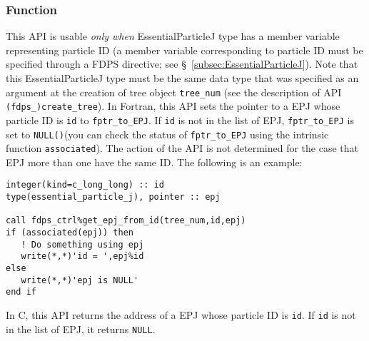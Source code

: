 \subsubsection*{Function}
This API is usable \textit{only when} EssentialParticleJ type has a member variable representing particle ID (a member variable corresponding to particle ID must be specified through a FDPS directive; see \S~\ref{subsec:EssentialParticleJ}). Note that this EssentialParticleJ type must be the same data type that was specified as an argument at the creation of tree object \texttt{tree\_num} (see the description of API \texttt{(fdps\_)create\_tree}). In Fortran, this API sets the pointer to a EPJ whose particle ID is \texttt{id} to \texttt{fptr\_to\_EPJ}. If \texttt{id} is not in the list of EPJ, \texttt{fptr\_to\_EPJ} is set to \texttt{NULL()}(you can check the status of \texttt{fptr\_to\_EPJ} using the intrinsic function \texttt{associated}). The action of the API is not determined for the case that EPJ more than one have the same ID. The following is an example:
\begin{lstlisting}[caption=Example]
integer(kind=c_long_long) :: id
type(essential_particle_j), pointer :: epj

call fdps_ctrl%get_epj_from_id(tree_num,id,epj)
if (associated(epj)) then
   ! Do something using epj
   write(*,*)'id = ',epj%id
else 
   write(*,*)'epj is NULL'
end if
\end{lstlisting}
In C, this API returns the address of a EPJ whose particle ID is \texttt{id}. If \texttt{id} is not in the list of EPJ, it returns \texttt{NULL}.

\clearpage